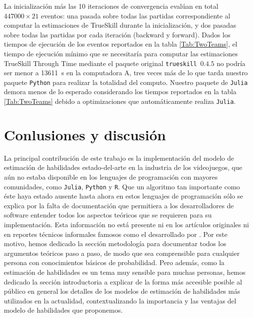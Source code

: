 \documentclass[a4paper,11pt]{book}
\theoremstyle{definition}
\newif\ifen
\newcommand{\en}[1]{\ifen#1\fi}
\begin{document}
%
La inicializaci\'on más las 10 iteraciones de convergencia eval\'uan en total $447000\times 21$ eventos: una pasada sobre todas las partidas correspondiente al computar la estimaciones de TrueSkill durante la inicializaci\'on, y dos pasadas sobre todas las partidas por cada iteraci\'on (backward y forward).
%
Dados los tiempos de ejecuci\'on de los eventos reportados en la tabla \ref{Tab:TwoTeams}, el tiempo de ejecuci\'on mínimo que se necesitaría para computar las estimaciones TrueSkill Through Time mediante el paquete original \texttt{trueskill}~$0.4.5$ no podría ser menor a \SI{13611}{\s} en la computadora A, tres veces más de lo que tarda nuestro paquete \texttt{Python} para realizar la totalidad del computo.
%
Nuestro paquete de \texttt{Julia} demora menos de lo esperado considerando los tiempos reportados en la tabla \ref{Tab:TwoTeams} debido a optimizaciones que automáticamente realiza \texttt{Julia}.
%




\section{Conlusiones y discusión} \label{sec:summary}
La principal contribuci\'on de este trabajo es la implementaci\'on del modelo de estimaci\'on de habilidades estado-del-arte en la industria de los videojuegos, que a\'un no estaba disponible en los lenguajes de programaci\'on con mayores comunidades, como \texttt{Julia}, \texttt{Python} y \texttt{R}.
%
Que un algoritmo tan importante como éste haya estado ausente hasta ahora en estos lenguajes de programaci\'on s\'olo se explica por la falta de documentaci\'on que permitiera a los desarrolladores de software entender todos los aspectos te\'oricos que se requieren para su implementaci\'on.
%
Esta informaci\'on no está presente ni en los artículos originales \cite{Herbrich2007, Dangauthier2007} ni en reportes técnicos informales famosos como el desarrollado por \cite{Mosser2011}.
%
Por este motivo, hemos dedicado la secci\'on metodología para documentar todos los argumentos te\'oricos paso a paso, de modo que sea comprensible para cualquier persona con conocimientos básicos de probabilidad.
%
Pero además, como la estimación de habilidades es un tema muy sensible para muchas personas, hemos dedicado la sección introductoria a explicar de la forma más accesible posible al público en general los detalles de los modelos de estimación de habilidades más utilizados en la actualidad, contextualizando la importancia y las ventajas del modelo de habilidades que proponemos.
\end{document}
